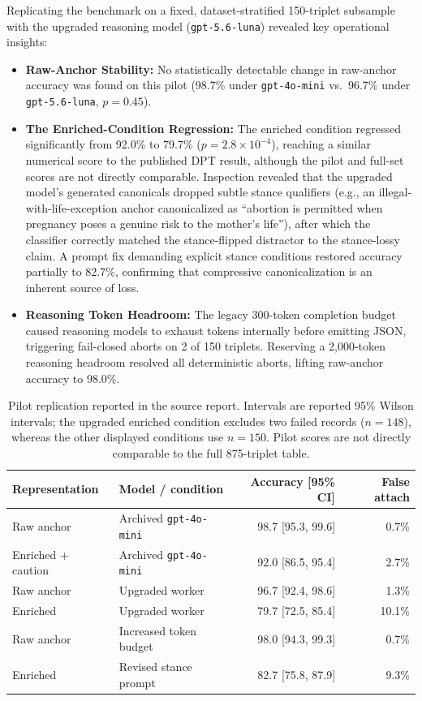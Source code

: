 \documentclass[11pt,a4paper]{article}
\begin{document}
Replicating the benchmark on a fixed, dataset-stratified 150-triplet subsample with the upgraded reasoning model (\texttt{gpt-5.6-luna}) revealed key operational insights:

\begin{itemize}
\item \textbf{Raw-Anchor Stability:} No statistically detectable change in raw-anchor accuracy was found on this pilot (98.7\% under \texttt{gpt-4o-mini} vs.\ 96.7\% under \texttt{gpt-5.6-luna}, $p = 0.45$).
\item \textbf{The Enriched-Condition Regression:} The enriched condition regressed significantly from 92.0\% to 79.7\% ($p = 2.8 \times 10^{-4}$), reaching a similar numerical score to the published DPT result, although the pilot and full-set scores are not directly comparable. Inspection revealed that the upgraded model's generated canonicals dropped subtle stance qualifiers (e.g., an illegal-with-life-exception anchor canonicalized as ``abortion is permitted when pregnancy poses a genuine risk to the mother's life''), after which the classifier correctly matched the stance-flipped distractor to the stance-lossy claim. A prompt fix demanding explicit stance conditions restored accuracy partially to 82.7\%, confirming that compressive canonicalization is an inherent source of loss.
\item \textbf{Reasoning Token Headroom:} The legacy 300-token completion budget caused reasoning models to exhaust tokens internally before emitting JSON, triggering fail-closed aborts on 2 of 150 triplets. Reserving a 2,000-token reasoning headroom resolved all deterministic aborts, lifting raw-anchor accuracy to 98.0\%.
\end{itemize}


\begin{table}[htbp]
\centering\small
\caption{Pilot replication reported in the source report. Intervals are reported 95\% Wilson intervals; the upgraded enriched condition excludes two failed records ($n=148$), whereas the other displayed conditions use $n=150$. Pilot scores are not directly comparable to the full 875-triplet table.}
\label{tab:pilot}
\begin{tabular}{@{}llrr@{}}
\toprule
Representation & Model / condition & Accuracy [95\% CI] & False attach \\
\midrule
Raw anchor & Archived \texttt{gpt-4o-mini} & 98.7 [95.3, 99.6] & 0.7\% \\
Enriched + caution & Archived \texttt{gpt-4o-mini} & 92.0 [86.5, 95.4] & 2.7\% \\
Raw anchor & Upgraded worker & 96.7 [92.4, 98.6] & 1.3\% \\
Enriched & Upgraded worker & 79.7 [72.5, 85.4] & 10.1\% \\
Raw anchor & Increased token budget & 98.0 [94.3, 99.3] & 0.7\% \\
Enriched & Revised stance prompt & 82.7 [75.8, 87.9] & 9.3\% \\
\bottomrule
\end{tabular}
\end{table}
\end{document}
